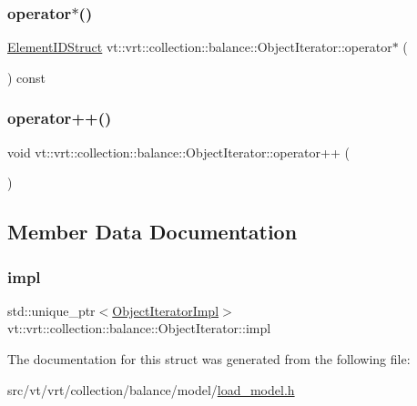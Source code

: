 \subsubsection{\texorpdfstring{operator$\ast$()}{operator*()}}
{\footnotesize\ttfamily \hyperlink{structvt_1_1vrt_1_1collection_1_1balance_1_1_element_i_d_struct}{Element\+I\+D\+Struct} vt\+::vrt\+::collection\+::balance\+::\+Object\+Iterator\+::operator$\ast$ (\begin{DoxyParamCaption}{ }\end{DoxyParamCaption}) const\hspace{0.3cm}{\ttfamily [inline]}}

\mbox{\label{structvt_1_1vrt_1_1collection_1_1balance_1_1_object_iterator_a22189471c74df1c8c1a29edf6f659244}} 
\subsubsection{\texorpdfstring{operator++()}{operator++()}}
{\footnotesize\ttfamily void vt\+::vrt\+::collection\+::balance\+::\+Object\+Iterator\+::operator++ (\begin{DoxyParamCaption}{ }\end{DoxyParamCaption})\hspace{0.3cm}{\ttfamily [inline]}}



\subsection{Member Data Documentation}
\mbox{\label{structvt_1_1vrt_1_1collection_1_1balance_1_1_object_iterator_abe8e8b725eca54696504c22edba21922}} 
\subsubsection{\texorpdfstring{impl}{impl}}
{\footnotesize\ttfamily std\+::unique\+\_\+ptr$<$\hyperlink{structvt_1_1vrt_1_1collection_1_1balance_1_1_object_iterator_impl}{Object\+Iterator\+Impl}$>$ vt\+::vrt\+::collection\+::balance\+::\+Object\+Iterator\+::impl\hspace{0.3cm}{\ttfamily [private]}}



The documentation for this struct was generated from the following file\+:\begin{DoxyCompactItemize}
\item 
src/vt/vrt/collection/balance/model/\hyperlink{load__model_8h}{load\+\_\+model.\+h}\end{DoxyCompactItemize}
